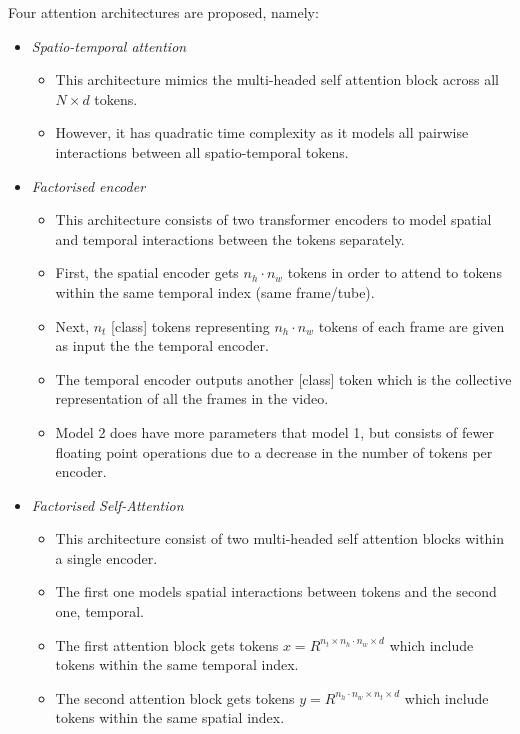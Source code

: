 \par Four attention architectures are proposed, namely:
\begin{itemize}
    \item \textit{Spatio-temporal attention}
    \begin{itemize}
        \item This architecture mimics the multi-headed self attention block \cite{tfm} across all ${N \times d}$ tokens.
        \item However, it has quadratic time complexity as it models all pairwise interactions between all spatio-temporal tokens.
    \end{itemize} 
    \item \textit{Factorised encoder}
    \begin{itemize}
        \item This architecture consists of two transformer encoders to model spatial and temporal interactions between the tokens separately.
        \item First, the spatial encoder gets $n_h \cdot n_w$ tokens in order to attend to tokens within the same temporal index (same frame/tube).
        \item Next, $n_t$ [class] tokens representing $n_h \cdot n_w$ tokens of each frame are given as input the the temporal encoder. 
        \item The temporal encoder outputs another [class] token which is the collective representation of all the frames in the video.
        \item Model 2 does have more parameters that model 1, but consists of fewer floating point operations due to a decrease in the number of tokens per encoder.
    \end{itemize}
    \item \textit{Factorised Self-Attention}
    \begin{itemize}
        \item This architecture consist of two multi-headed self attention blocks within a single encoder.
        \item The first one models spatial interactions between tokens and the second one, temporal.
        \item The first attention block gets tokens $x = R^{n_t \times n_h \cdot n_w \times d}$ which include tokens within the same temporal index.
        \item The second attention block gets tokens $y = R^{n_h \cdot n_w \times n_t \times d}$ which include tokens within the same spatial index.

\end{itemize}
\end{itemize}
